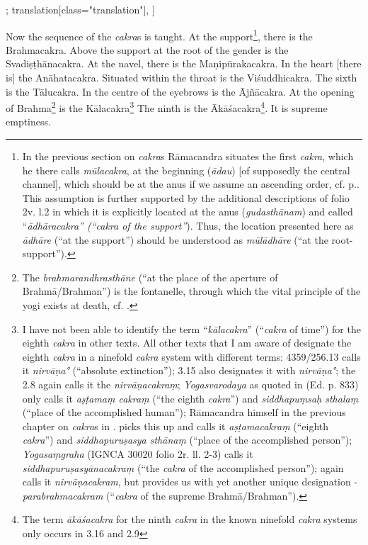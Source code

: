 \begin{alignment}[
  texts=edition[class="edition"];
  translation[class="translation"],
  ]
\begin{translation}
\begin{tlate}
Now the sequence of the \textit{cakra}s is taught. At the support\footnote{In the previous section on \textit{cakra}s Rāmacandra situates the first \textit{cakra}, which he there calls \textit{mūlacakra}, at the beginning (\textit{ādau}) [of supposedly the central channel], which should be at the anus if we assume an ascending order, cf. p.\pageref{cakra1}. This assumption is further supported by the additional descriptions of  folio 2v. l.2 in which it is explicitly located at the anus (\textit{gudasthānam}) and called ``\textit{ādhāracakra'' (``\textit{cakra} of the support''}). Thus, the location presented here as \textit{ādhāre} (``at the support'') should be understood as \textit{mūlādhāre} (``at the root-support'').}, there is the Brahmacakra. Above the support at the root of the gender is the Svadiṣṭhānacakra. At the navel, there is the Maṇipūrakacakra. In the heart [there is] the Anāhatacakra.\textsuperscript{\coro{[\lowroman{5}]}} Situated within the throat is the Viśuddhicakra. The sixth is the Tālucakra. In the centre of the eyebrows is the Ājñācakra. At the opening of Brahma\footnote{The \textit{brahmarandhrasthāne} (``at the place of the aperture of Brahmā/Brahman'') is the fontanelle, through which the vital principle of the yogi exists at death, cf. \citeauthor[2017:438]{rootsofyoga2017}.} is the Kālacakra\footnote{I have not been able to identify the term ``\textit{kālacakra}'' (``\textit{cakra} of time'') for the eighth \textit{cakra} in other texts. All other texts that I am aware of designate the eighth \textit{cakra} in a ninefold \textit{cakra} system with different terms:  4359/256.13 calls it \textit{nirvāṇa°} (``absolute extinction'');  3.15 also designates it with \textit{nirvāṇa°}; the  2.8 again calls it the \textit{nirvāṇacakraṃ}; \textit{Yogasvarodaya} as quoted in  (Ed. p. 833) only calls it \textit{aṣṭamaṃ cakraṃ} (``the eighth \textit{cakra}'') and \textit{siddhapuṃsaḥ sthalaṃ} (``place of the accomplished human''); Rāmacandra himself in the previous chapter on \textit{cakra}s in .\textsuperscript{} picks this up and calls it \textit{aṣṭamacakraṃ} (``eighth \textit{cakra}'') and \textit{siddhapuruṣasya sthānaṃ} (``place of the accomplished person''); \textit{Yogasaṃgraha} (IGNCA 30020 folio 2r. ll. 2-3) calls it \textit{siddhapuruṣasyānacakraṃ} (``the \textit{cakra} of the accomplished person'');  again calls it \textit{nirvāṇacakram}, but provides us with yet another unique designation - \textit{parabrahmacakram} (``\textit{cakra} of the supreme Brahmā/Brahman'').} The ninth is the Ākāśacakra\footnote{The term \textit{ākāśacakra} for the ninth \textit{cakra} in the known ninefold \textit{cakra} systems only occurs in  3.16 and  2.9}.\textsuperscript{\coro{[\lowroman{10}]}} It is supreme emptiness.
    \end{tlate}
  \end{translation}
\end{alignment}
